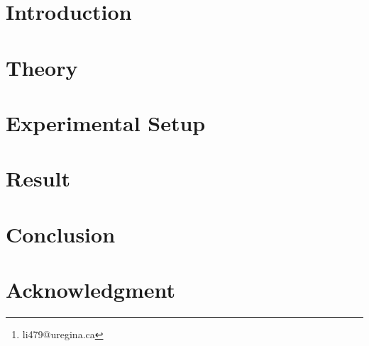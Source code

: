 \documentclass[a4paper, 12pt]{article}
\begin{document}
\newcommand{\cue}{\mathcal{E}}

\doublespacing

\title{}
\author{Wenliang Li\thanks{li479@uregina.ca}\\ \normalsize Department of Physics, University of Regina \\}

\maketitle

\begin{abstract}
\end{abstract}

\section{Introduction}
\section{Theory}
\section{Experimental Setup}
\section{Result}
\section{Conclusion}
\section*{Acknowledgment}

\begin{thebibliography}{00}
\end{thebibliography}
\end{document}
